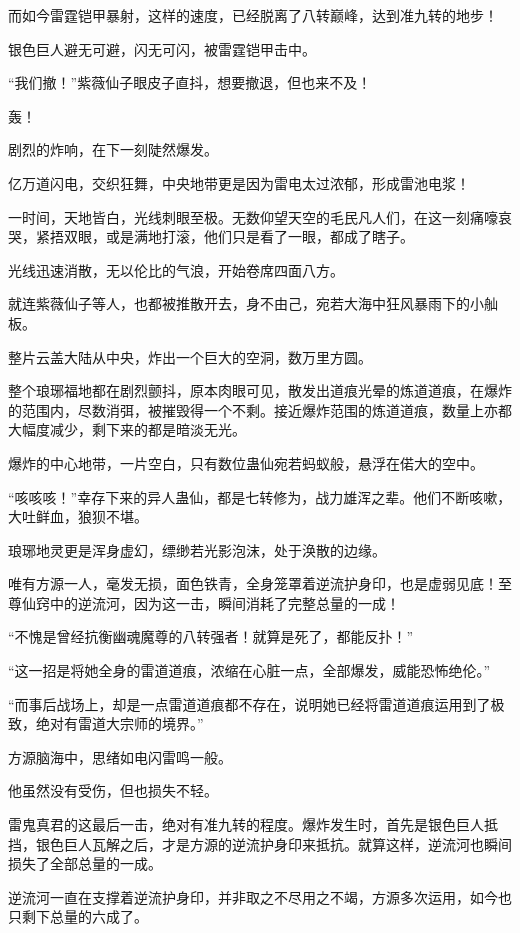 \begin{this_body}
而如今雷霆铠甲暴射，这样的速度，已经脱离了八转巅峰，达到准九转的地步！

银色巨人避无可避，闪无可闪，被雷霆铠甲击中。

“我们撤！”紫薇仙子眼皮子直抖，想要撤退，但也来不及！

轰！

剧烈的炸响，在下一刻陡然爆发。

亿万道闪电，交织狂舞，中央地带更是因为雷电太过浓郁，形成雷池电浆！

一时间，天地皆白，光线刺眼至极。无数仰望天空的毛民凡人们，在这一刻痛嚎哀哭，紧捂双眼，或是满地打滚，他们只是看了一眼，都成了瞎子。

光线迅速消散，无以伦比的气浪，开始卷席四面八方。

就连紫薇仙子等人，也都被推散开去，身不由己，宛若大海中狂风暴雨下的小舢板。

整片云盖大陆从中央，炸出一个巨大的空洞，数万里方圆。

整个琅琊福地都在剧烈颤抖，原本肉眼可见，散发出道痕光晕的炼道道痕，在爆炸的范围内，尽数消弭，被摧毁得一个不剩。接近爆炸范围的炼道道痕，数量上亦都大幅度减少，剩下来的都是暗淡无光。

爆炸的中心地带，一片空白，只有数位蛊仙宛若蚂蚁般，悬浮在偌大的空中。

“咳咳咳！”幸存下来的异人蛊仙，都是七转修为，战力雄浑之辈。他们不断咳嗽，大吐鲜血，狼狈不堪。

琅琊地灵更是浑身虚幻，缥缈若光影泡沫，处于涣散的边缘。

唯有方源一人，毫发无损，面色铁青，全身笼罩着逆流护身印，也是虚弱见底！至尊仙窍中的逆流河，因为这一击，瞬间消耗了完整总量的一成！

“不愧是曾经抗衡幽魂魔尊的八转强者！就算是死了，都能反扑！”

“这一招是将她全身的雷道道痕，浓缩在心脏一点，全部爆发，威能恐怖绝伦。”

“而事后战场上，却是一点雷道道痕都不存在，说明她已经将雷道道痕运用到了极致，绝对有雷道大宗师的境界。”

方源脑海中，思绪如电闪雷鸣一般。

他虽然没有受伤，但也损失不轻。

雷鬼真君的这最后一击，绝对有准九转的程度。爆炸发生时，首先是银色巨人抵挡，银色巨人瓦解之后，才是方源的逆流护身印来抵抗。就算这样，逆流河也瞬间损失了全部总量的一成。

逆流河一直在支撑着逆流护身印，并非取之不尽用之不竭，方源多次运用，如今也只剩下总量的六成了。


\end{this_body}
